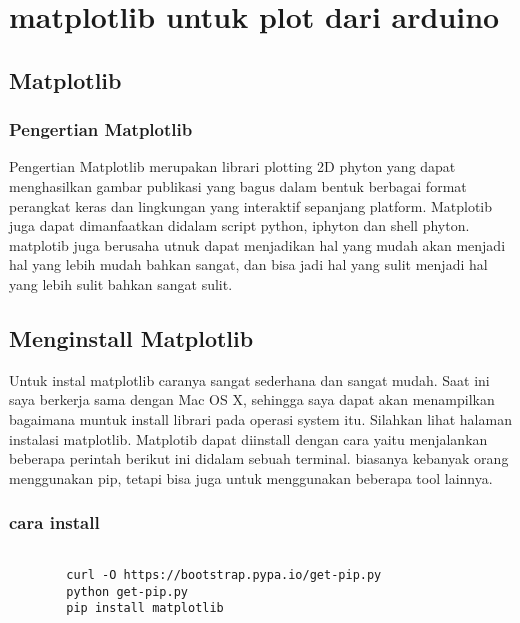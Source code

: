 
\section {matplotlib untuk plot dari arduino}

\subsection {Matplotlib}
\subsubsection {Pengertian Matplotlib}
	Pengertian Matplotlib merupakan librari plotting 2D phyton yang dapat menghasilkan gambar publikasi yang bagus dalam bentuk berbagai format perangkat keras dan lingkungan yang interaktif sepanjang platform. Matplotib juga dapat dimanfaatkan didalam script python, iphyton dan shell phyton. matplotib juga berusaha utnuk dapat menjadikan hal yang mudah akan menjadi hal yang lebih mudah bahkan sangat, dan bisa jadi hal yang sulit menjadi hal yang lebih sulit bahkan sangat sulit.
	
\subsection {Menginstall Matplotlib}
	Untuk instal matplotlib caranya sangat sederhana dan sangat mudah. Saat ini saya berkerja sama dengan Mac OS X, sehingga saya dapat akan menampilkan bagaimana muntuk install librari pada operasi system itu. Silahkan lihat halaman instalasi matplotlib.	Matplotib dapat diinstall dengan cara yaitu menjalankan beberapa perintah berikut ini didalam sebuah terminal. biasanya kebanyak orang menggunakan pip, tetapi bisa juga untuk menggunakan beberapa tool lainnya.

	\subsubsection{cara install}
	\begin{verbatim} 
	
		curl -O https://bootstrap.pypa.io/get-pip.py
		python get-pip.py
		pip install matplotlib

	\end{verbatim}
	
